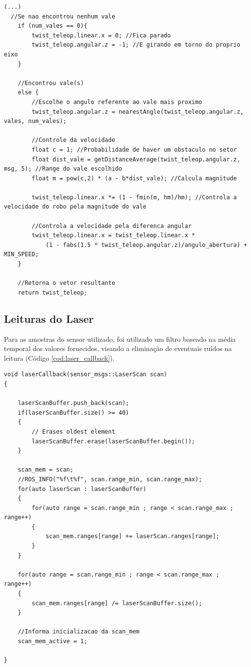 \begin{lstlisting}[frame=single, label=cod:vales, style=customc, caption={Escolha da direção e velocidade}]
(...)
  //Se nao encontrou nenhum vale
    if (num_vales == 0){
        twist_teleop.linear.x = 0; //Fica parado
        twist_teleop.angular.z = -1; //E girando em torno do proprio eixo
    }
    
    //Encontrou vale(s)
    else {
        //Escolhe o angulo referente ao vale mais proximo
        twist_teleop.angular.z = nearestAngle(twist_teleop.angular.z, vales, num_vales);
        
        //Controle da velocidade
        float c = 1; //Probabilidade de haver um obstaculo no setor
        float dist_vale = getDistanceAverage(twist_teleop.angular.z, msg, 5); //Range do vale escolhido
        float m = pow(c,2) * (a - b*dist_vale); //Calcula magnitude
        
        twist_teleop.linear.x *= (1 - fmin(m, hm)/hm); //Controla a velocidade do robo pela magnitude do vale
        
        //Controla a velocidade pela diferenca angular
        twist_teleop.linear.x = twist_teleop.linear.x *
            (1 - fabs(1.5 * twist_teleop.angular.z)/angulo_abertura) + MIN_SPEED;
    }
    
    //Retorna o vetor resultante
    return twist_teleop;

\end{lstlisting}

\subsection{Leituras do Laser}

Para as amostras do sensor utilizado, foi utilizado um filtro baseado
na média temporal dos valores fornecidos, visando a eliminação de
eventuais ruídos na leitura (Código \ref{cod:laser_callback}).

\begin{lstlisting}[frame=single, label=cod:laser_callback, style=customc, caption={Filtro de amostras do laser}]
void laserCallback(sensor_msgs::LaserScan scan)
{
    
    laserScanBuffer.push_back(scan);
    if(laserScanBuffer.size() >= 40)
    {
        // Erases oldest element
        laserScanBuffer.erase(laserScanBuffer.begin());
    }
    
    scan_mem = scan;
    //ROS_INFO("%f\t%f", scan.range_min, scan.range_max);
    for(auto laserScan : laserScanBuffer)
    {
        for(auto range = scan.range_min ; range < scan.range_max ; range++)
        {
            scan_mem.ranges[range] += laserScan.ranges[range];
        }
    }
    
    for(auto range = scan.range_min ; range < scan.range_max ; range++)
    {
        scan_mem.ranges[range] /= laserScanBuffer.size();
    }
    
    //Informa inicializacao da scan_mem
    scan_mem_active = 1;
    
}
\end{lstlisting}
